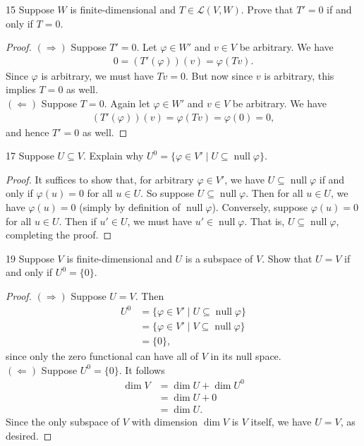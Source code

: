 \documentclass[11pt]{extarticle}
\newenvironment{problem}[1]{\begin{prob*}{#1}{}}{\end{prob*}}
\newcommand{\Hom}{\mathcal{L}}
\DeclareMathOperator{\Null}{null}
\begin{document}
\begin{problem}{15}
Suppose $W$ is finite-dimensional and $T\in\Hom(V,W)$.  Prove that $T' = 0$ if and only if $T = 0$.
\end{problem}
\begin{proof}
$(\Rightarrow)$ Suppose $T' = 0$.  Let $\varphi\in W'$ and $v\in V$ be arbitrary.  We have
\begin{align*}
0 = (T'(\varphi))(v) = \varphi(Tv).
\end{align*}
Since $\varphi$ is arbitrary, we must have $Tv = 0$.  But now since $v$ is arbitrary, this implies $T = 0$ as well.\\
\indent $(\Leftarrow)$ Suppose $T = 0$.  Again let $\varphi\in W'$ and $v\in V$ be arbitrary.  We have
\begin{align*}
(T'(\varphi))(v) = \varphi(Tv) = \varphi(0) = 0,
\end{align*}
and hence $T' = 0$ as well.
\end{proof}

\begin{problem}{17}
Suppose $U\subseteq V$.  Explain why $U^0=\{\varphi\in V'\mid U\subseteq \Null\varphi\}$.  
\end{problem}
\begin{proof}
It suffices to show that, for arbitrary $\varphi\in V'$, we have $U\subseteq \Null\varphi$ if and only if $\varphi(u)=0$ for all $u \in U$.  So suppose $U \subseteq\Null\varphi$.  Then for all $u\in U$, we have $\varphi(u) = 0$ (simply by definition of $\Null\varphi$).  Conversely, suppose $\varphi(u)=0$ for all $u\in U$.  Then if $u'\in U$, we must have $u'\in\Null\varphi$.  That is, $U\subseteq\Null\varphi$, completing the proof.
\end{proof}

\begin{problem}{19}
Suppose $V$ is finite-dimensional and $U$ is a subspace of $V$.  Show that $U = V$ if and only if $U^0=\{0\}$. 
\end{problem}
\begin{proof}
$(\Rightarrow)$ Suppose $U=V$.  Then 
\begin{align*}
U^0 &= \{\varphi \in V'\mid U\subseteq \Null\varphi\}\\
&=  \{\varphi \in V'\mid V\subseteq \Null\varphi\}\\
&= \{0\},
\end{align*}
since only the zero functional can have all of $V$ in its null space.\\
\indent $(\Leftarrow)$ Suppose $U^0 = \{0\}$.  It follows
\begin{align*}
\dim V &= \dim U + \dim U^0\\
           &= \dim U + 0\\
           &= \dim U.
\end{align*}
Since the only subspace of $V$ with dimension $\dim V$ is $V$ itself, we have $U = V$, as desired.
\end{proof}
\end{document}
